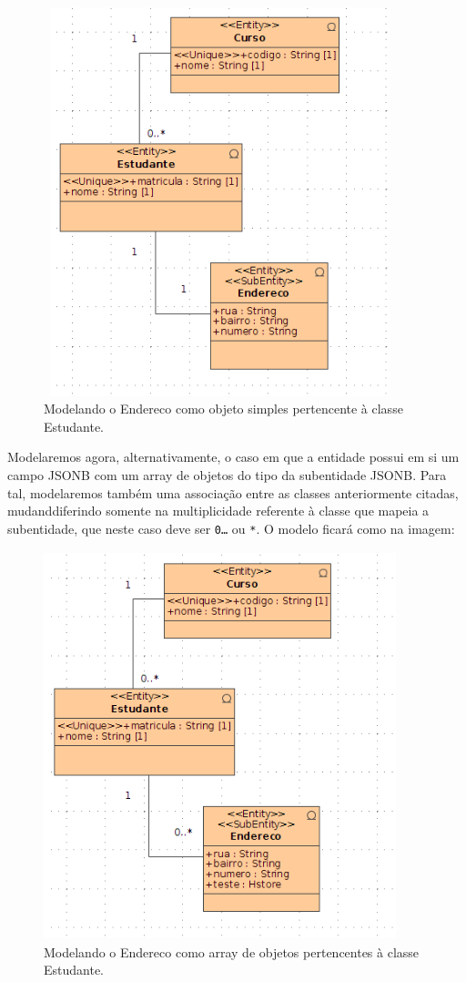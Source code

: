 \begin{figure}[H]
	\centering
	\includegraphics[width=290pt,height=320pt]{files/imgs/tutorial-mdarte-jsonb-0000.png}
	\caption{Modelando o Endereco como objeto simples pertencente à classe
	Estudante.}
	\label{camada_dominio_endereco_estereotipos}
\end{figure}

Modelaremos agora, alternativamente, o caso em que a entidade possui em si um
campo JSONB com um array de objetos do tipo da subentidade JSONB. Para tal,
modelaremos também uma associação entre as classes anteriormente citadas,
mudanddiferindo somente na multiplicidade referente à classe que mapeia a
subentidade, que neste caso deve ser \texttt{0\ldots*} ou \texttt{*}. O modelo
ficará como na imagem:

\begin{figure}[H]
	\centering
	\includegraphics[width=290pt,height=320pt]{files/imgs/tutorial-mdarte-jsonb-0001.png}
	\caption{Modelando o Endereco como array de objetos pertencentes à
	classe Estudante.}
	\label{camada_dominio_endereco_estereotipos}
\end{figure}

